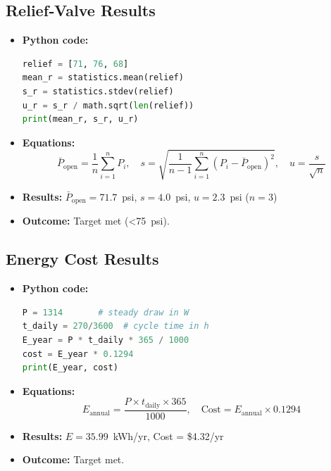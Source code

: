 \documentclass[12pt]{report}
\begin{document}
\subsection{Relief‑Valve Results}
\begin{itemize}[leftmargin=*]
  \item \textbf{Python code:}
    \begin{lstlisting}[language=Python]
relief = [71, 76, 68]
mean_r = statistics.mean(relief)
s_r = statistics.stdev(relief)
u_r = s_r / math.sqrt(len(relief))
print(mean_r, s_r, u_r)
    \end{lstlisting}
  \item \textbf{Equations:}
    \[
      \bar P_{\mathrm{open}} = \frac{1}{n}\sum_{i=1}^n P_i,\quad
      s = \sqrt{\frac{1}{n-1}\sum_{i=1}^n (P_i - \bar P_{\mathrm{open}})^2},\quad
      u = \frac{s}{\sqrt{n}}
    \]
  \item \textbf{Results:} $\bar P_{\mathrm{open}} = 71.7$ psi, $s = 4.0$ psi, $u = 2.3$ psi ($n=3$)
  \item \textbf{Outcome:} Target met (<75 psi).
\end{itemize}

\subsection{Energy Cost Results}
\begin{itemize}[leftmargin=*]
  \item \textbf{Python code:}
    \begin{lstlisting}[language=Python]
P = 1314       # steady draw in W
t_daily = 270/3600  # cycle time in h
E_year = P * t_daily * 365 / 1000
cost = E_year * 0.1294
print(E_year, cost)
    \end{lstlisting}
  \item \textbf{Equations:}
    \[
      E_{\mathrm{annual}}
        = \frac{P \times t_{\mathrm{daily}} \times 365}{1000},\quad
      \text{Cost}
        = E_{\mathrm{annual}} \times 0.1294
    \]
  \item \textbf{Results:} $E = 35.99$ kWh/yr, Cost = \$4.32/yr
  \item \textbf{Outcome:} Target met.
\end{itemize}
\end{document}
